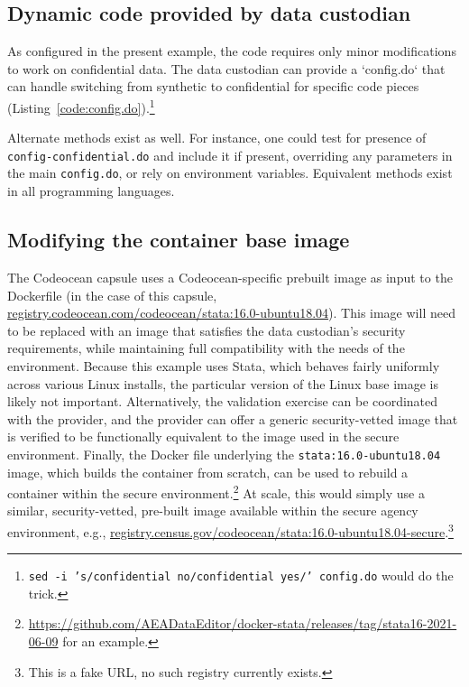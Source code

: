 \documentclass[inline]{hdsr}
\begin{document}
\subsection{Dynamic code provided by data custodian}

As configured in the present example, the code requires only minor modifications to work on confidential data. The data custodian can provide a `config.do`  that can handle switching from synthetic to confidential for specific code pieces (Listing~\ref{code:config.do}).\footnote{\texttt{sed -i 's/confidential no/confidential yes/' config.do} would do the trick.}



Alternate methods exist as well. For instance, one could test for presence of \texttt{config-confidential.do} and include it if present, overriding any parameters in the main \texttt{config.do}, or rely on environment variables. Equivalent methods exist in all programming languages.

\subsection{Modifying the container base image}

The Codeocean capsule uses a Codeocean-specific prebuilt image as input to the Dockerfile  (in the case of this capsule, \url{registry.codeocean.com/codeocean/stata:16.0-ubuntu18.04}). This image will need to be replaced with an image that satisfies the data custodian's security requirements, while maintaining full compatibility with the needs of the environment. Because this example uses Stata, which behaves fairly uniformly across various Linux installs, the particular version of the Linux base image is likely not important.   Alternatively, the validation exercise can be coordinated with the provider, and the provider can offer a generic security-vetted image that is verified to be functionally equivalent to the image used in the secure environment. Finally, the Docker file underlying the \texttt{stata:16.0-ubuntu18.04} image, which builds the container from scratch, can be used to rebuild a container within the secure environment.\footnote{\href{github.com/AEADataEditor/docker-stata/releases/tag/stata16-2021-06-09}{https://github.com/AEADataEditor/docker-stata/releases/tag/stata16-2021-06-09} for an example.} At scale, this would simply use a similar, security-vetted, pre-built image available within the secure agency environment, e.g., \url{registry.census.gov/codeocean/stata:16.0-ubuntu18.04-secure}.\footnote{This is a fake URL, no such registry currently exists.}
\end{document}
